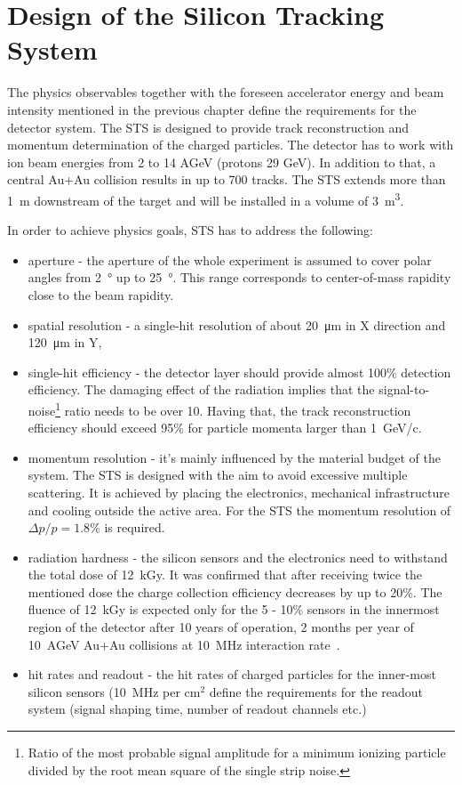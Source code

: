\section{Design of the Silicon Tracking System}
\label{STS}

The physics observables together with the foreseen accelerator energy and beam intensity mentioned in the previous chapter define the requirements for the detector system. The \gls{STS} is designed to provide track reconstruction and momentum determination of the charged particles. The detector has to work with ion beam energies from 2 to 14 AGeV (protons 29 GeV). In addition to that, a central Au+Au collision results in up to 700 tracks. The \gls{STS} extends more than \SI{1}{\metre} downstream of the target and will be installed in a volume of \SI{3}{\cubic\metre}. 

In order to achieve physics goals, \gls{STS} has to address the following:
\begin{itemize}
    \item  aperture - the aperture of the whole experiment is assumed to cover polar angles from \SI{2}{\degree} up to \SI{25}{\degree}. This range corresponds to center-of-mass rapidity close to the beam rapidity. 
    \item spatial resolution - a single-hit resolution of about \SI{20}{\micro\metre} in X direction and \SI{120}{\micro\metre} in Y, 
    \item single-hit efficiency - the detector layer should provide almost 100\% detection efficiency. The damaging effect of the radiation implies that the signal-to-noise\footnote{Ratio of the most probable signal amplitude for a minimum ionizing particle divided by the root mean square of the single strip noise.} ratio needs to be over 10. Having that, the track reconstruction efficiency should exceed 95\% for particle momenta larger than 1~GeV/c. 
    \item momentum resolution - it's mainly influenced by the material budget of the system. The \gls{STS} is designed with the aim to avoid excessive multiple scattering. It is achieved by placing the electronics, mechanical infrastructure and cooling outside the active area. For the \gls{STS} the momentum resolution of $\Delta p/p = 1.8\%$ is required. 
    \item radiation hardness - the silicon sensors and the electronics need to withstand the total dose of 12~kGy. It was confirmed that after receiving twice the mentioned dose the charge collection efficiency decreases by up to 20\%. The fluence of 12~kGy is expected only for the 5 - 10\% sensors in the innermost region of the detector after 10 years of operation, 2 months per year of 10~AGeV Au+Au collisions at 10~MHz interaction rate~\cite{Heuser:54798}.
    \item hit rates and readout - the hit rates of charged particles for the inner-most silicon sensors (10~MHz per $\mathrm{cm^{2}}$ define the requirements for the readout system (signal shaping time, number of readout channels etc.)
\end{itemize}


